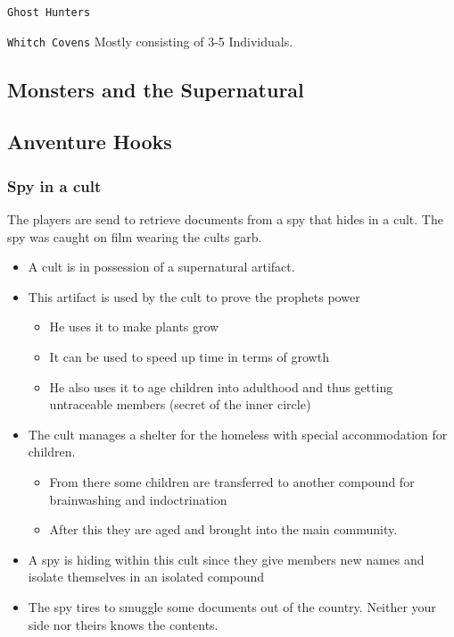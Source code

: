 \documentclass[11pt]{article}
\begin{document}
{\texttt{Ghost Hunters}

\texttt{Whitch Covens}
Mostly consisting of 3-5 Individuals.

\subsection{Monsters and the Supernatural}
\label{sec:orgfd9c7a1}

\subsection{Anventure Hooks}
\label{sec:orgd901f0d}
\subsubsection{Spy in a cult}
\label{sec:org8b8a513}

The players are send to retrieve documents from a spy that hides in a cult. The spy was caught on film wearing the cults garb. 

\begin{itemize}
\item A cult is in possession of a supernatural artifact.
\item This artifact is used by the cult to prove the prophets power
\begin{itemize}
\item He uses it to make plants grow
\item It can be used to speed up time in terms of growth
\item He also uses it to age children into adulthood and thus getting untraceable members (secret of the inner circle)
\end{itemize}
\item The cult manages a shelter for the homeless with special accommodation for children.
\begin{itemize}
\item From there some children are transferred to another compound for brainwashing and indoctrination
\item After this they are aged and brought into the main community.
\end{itemize}
\item A spy is hiding within this cult since they give members new names and isolate themselves in an isolated compound
\item The spy tires to smuggle some documents out of the country. Neither your side nor theirs knows the contents.
\end{itemize}

}
\end{document}

